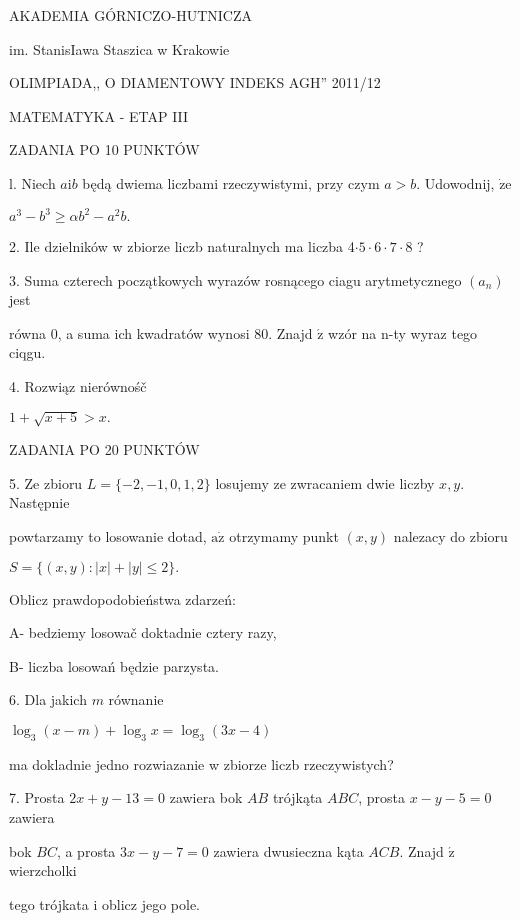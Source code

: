 \documentclass[a4paper,12pt]{article}
\begin{document}
AKADEMIA GÓRNICZO-HUTNICZA

im. StanisIawa Staszica w Krakowie

OLIMPIADA,, O DIAMENTOWY INDEKS AGH'' 2011/12

MATEMATYKA - ETAP III

ZADANIA PO 10 PUNKTÓW

l. Niech $a\mathrm{i}b$ będą dwiema liczbami rzeczywistymi, przy czym $a>b$. Udowodnij, $\dot{\mathrm{z}}\mathrm{e}$

$a^{3}-b^{3}\geq\alpha b^{2}-a^{2}b.$

2. Ile dzielników w zbiorze liczb naturalnych ma liczba 4$\cdot 5\cdot 6\cdot 7\cdot 8$ ?

3. Suma czterech początkowych wyrazów rosnącego ciagu arytmetycznego $(a_{n})$ jest

równa 0, a suma ich kwadratów wynosi 80. Znajd $\acute{\mathrm{z}}$ wzór na n-ty wyraz tego ciqgu.

4. Rozwiąz nierównośč

$1+\sqrt{x+5}>x.$

ZADANIA PO 20 PUNKTÓW

5. Ze zbioru $L=\{-2,-1,0,1,2\}$ losujemy ze zwracaniem dwie liczby $x, y$. Następnie

powtarzamy to losowanie dotad, $\mathrm{a}\dot{\mathrm{z}}$ otrzymamy punkt $(x,y)$ nalezacy do zbioru

$S=\{(x,y):|x|+|y|\leq 2\}.$

Oblicz prawdopodobieństwa zdarzeń:

A- bedziemy losowač doktadnie cztery razy,

B- liczba losowań będzie parzysta.

6. Dla jakich $m$ równanie

$\log_{3}(x-m)+\log_{3}x=\log_{3}(3x-4)$

ma dokladnie jedno rozwiazanie w zbiorze liczb rzeczywistych?

7. Prosta $2x+y-13=0$ zawiera bok $AB$ trójkąta $ABC$, prosta $x-y-5=0$ zawiera

bok $BC$, a prosta $3x-y-7=0$ zawiera dwusieczna kąta $ACB.$ Znajd $\acute{\mathrm{z}}$ wierzcholki

tego trójkata i oblicz jego pole.
\end{document}
